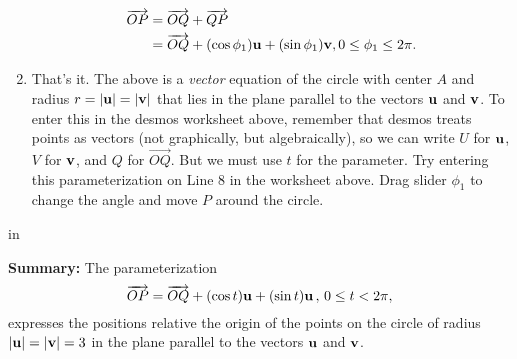\documentclass{ximera}
\newcommand{\pskip}{\vskip 0.1 in}
\begin{document}
\begin{question}
\begin{enumerate}
{\begin{expandable}
\begin{align*}
   \overrightarrow{OP} &= \overrightarrow{OQ} + \overrightarrow{QP} \\
                                   & = \overrightarrow{OQ} + (\cos\phi_1) {\bf u} + (\sin\phi_1){\bf v} , 0\leq \phi_1 \leq 2\pi .
\end{align*}
\end{expandable}
}

\item{That's it. The above is a \emph{vector} equation of the circle with center $A$ and radius $r=|{\bf u}| = |{\bf v}|$ that lies in the plane parallel to the vectors ${\bf u}$ and ${\bf v}$. To enter this in the desmos worksheet above, remember that desmos treats points as vectors (not graphically, but algebraically), so we can write $U$ for ${\bf u}$, $V$ for ${\bf v}$, and $Q$ for $\overrightarrow{OQ}$. But we must use $t$ for the parameter. Try entering this parameterization on Line 8 in the worksheet above. Drag slider $\phi_1$ to change the angle and move $P$ around the circle.
}
\end{enumerate}

\pskip

{\bf Summary:} The parameterization
\[
      \overrightarrow{OP} = \overrightarrow{OQ} + (\cos t){\bf u} + (\sin t){\bf u}\, , \, 0\leq t < 2\pi ,
\]
expresses the positions relative the origin of the points on the circle of radius $|{\bf u}| = |{\bf v}|=3$ in the plane parallel to the vectors ${\bf u}$ and ${\bf v}$.
\end{question}
\end{document}
